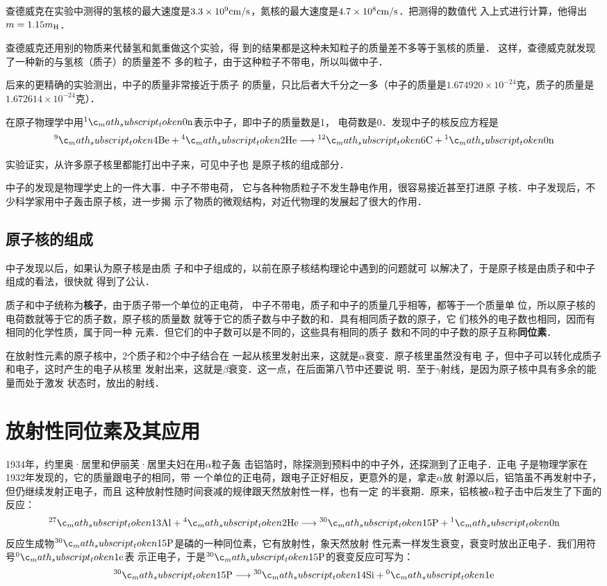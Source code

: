 查德威克在实验中测得的氢核的最大速度是$3.3\times10^9{\rm cm}/{\rm s}$，氮核的最大速度是$4.7\times10^8{\rm cm}/{\rm s}$．把测得的数值代
入上式进行计算，他得出$m=1.15m_{\rm H}$．

查德威克还用别的物质来代替氢和氮重做这个实验，得
到的结果都是这种未知粒子的质量差不多等于氢核的质量．
这样，查德威克就发现了一种新的与氢核（质子）的质量差不
多的粒子，由于这种粒子不带电，所以叫做中子．

后来的更精确的实验测出，中子的质量非常接近于质子
的质量，只比后者大千分之一多（中子的质量是$1.674920\times
10^{-24}$克，质子的质量是$1.672614\times10^{-24}$克）．

在原子物理学中用$\atom{n}{1}{0}$表示中子，即中子的质量数是1，
电荷数是0．发现中子的核反应方程是
\[\atom{Be}{9}{4}+\atom{He}{4}{2}\longrightarrow \atom{C}{12}{6}+\atom{n}{1}{0}  \]

实验证实，从许多原子核里都能打出中子来，可见中子也
是原子核的组成部分．

中子的发现是物理学史上的一件大事．中子不带电荷，
它与各种物质粒子不发生静电作用，很容易接近甚至打进原
子核．中子发现后，不少科学家用中子轰击原子核，进一步揭
示了物质的微观结构，对近代物理的发展起了很大的作用．

\subsection{原子核的组成}

中子发现以后，如果认为原子核是由质
子和中子组成的，以前在原子核结构理论中遇到的问题就可
以解决了，于是原子核是由质子和中子组成的看法，很快就
得到了公认．

质子和中子统称为\textbf{核子}，由于质子带一个单位的正电荷，
中子不带电，质子和中子的质量几乎相等，都等于一个质量单
位，所以原子核的电荷数就等于它的质子数，原子核的质量数
就等于它的质子数与中子数的和．具有相同质子数的原子，它
们核外的电子数也相同，因而有相同的化学性质，属于同一种
元素．但它们的中子数可以是不同的，这些具有相同的质子
数和不同的中子数的原子互称\textbf{同位素}．

在放射性元素的原子核中，2个质子和2个中子结合在
一起从核里发射出来，这就是$\alpha$衰变．原子核里虽然没有电
子，但中子可以转化成质子和电子，这时产生的电子从核里
发射出来，这就是$\beta$衰变．这一点，在后面第八节中还要说
明．至于$\gamma$射线，是因为原子核中具有多余的能量而处于激发
状态时，放出的射线．


\section{放射性同位素及其应用}
1934年，约里奥·居里和伊丽芙·居里夫妇在用$\alpha$粒子轰
击铝箔时，除探测到预料中的中子外，还探测到了正电子．正电
子是物理学家在1932年发现的，它的质量跟电子的相同，带
一个单位的正电荷，跟电子正好相反，更意外的是，拿走$\alpha$放
射源以后，铝箔虽不再发射中子，但仍继续发射正电子，而且
这种放射性随时间衰减的规律跟天然放射性一样，也有一定
的半衰期．原来，铝核被$\alpha$粒子击中后发生了下面的反应：
\[\atom{Al}{27}{13}+\atom{He}{4}{2}\longrightarrow\atom{P}{30}{15}+\atom{n}{1}{0}  \]
反应生成物$\atom{P}{30}{15}$是磷的一种同位素，它有放射性，象天然放射
性元素一样发生衰变，衰变时放出正电子．我们用符号$\atom{e}{0}{1}$表
示正电子，于是$\atom{P}{30}{15}$的衰变反应可写为：
\[\atom{P}{30}{15}\longrightarrow \atom{Si}{30}{14}+\atom{e}{0}{1} \]

